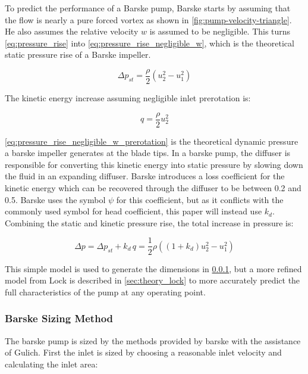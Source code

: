 To predict the performance of a Barske pump, Barske starts by assuming that the flow is nearly a pure forced vortex as shown in \cref{fig:pump-velocity-triangle}. He also assumes the relative velocity $w$ is assumed to be negligible. This turns \cref{eq:pressure_rise} into \cref{eq:pressure_rise_negligible_w}, which is the theoretical static pressure rise of a Barske impeller.

\begin{equation}
    \Delta p_{st} = \frac{\rho}{2}\left(u_2^2-u_1^2\right)
    \label{eq:pressure_rise_negligible_w}
\end{equation}

The kinetic energy increase assuming negligible inlet prerotation is:

\begin{equation}
    q = \frac{\rho}{2}u_2^2
    \label{eq:pressure_rise_negligible_w_prerotation}
\end{equation}

\cref{eq:pressure_rise_negligible_w_prerotation} is the theoretical dynamic pressure a barske impeller generates at the blade tips. In a barske pump, the diffuser is responsible for converting this kinetic energy into static pressure by slowing down the fluid in an expanding diffuser. Barske introduces a loss coefficient for the kinetic energy which can be recovered through the diffuser to be between 0.2 and 0.5. Barske uses the symbol $\psi$ for this coefficient, but as it conflicts with the commonly used symbol for head coefficient, this paper will instead use $k_d$. Combining the static and kinetic pressure rise, the total increase in pressure is:

\begin{equation}
    \Delta p = \Delta p_{st} + k_d\, q=\frac{1}{2}\rho\left((1+k_d) u_2^2 - u_1^2\right)
    \label{eq:barske_pressure_rise}
\end{equation}

This simple model is used to generate the dimensions in \cref{sec:theory_barske_sizing}, but a more refined model from Lock \cite{lockForcedVortexPump1966} is described in \cref{sec:theory_lock} to more accurately predict the full characteristics of the pump at any operating point.

\subsubsection{Barske Sizing Method}
\label{sec:theory_barske_sizing}

The barske pump is sized by the methods provided by barske \cite{barskeDesignOpenImpeller} with the assistance of Gulich. First the inlet is sized by choosing a reasonable inlet velocity and calculating the inlet area:

